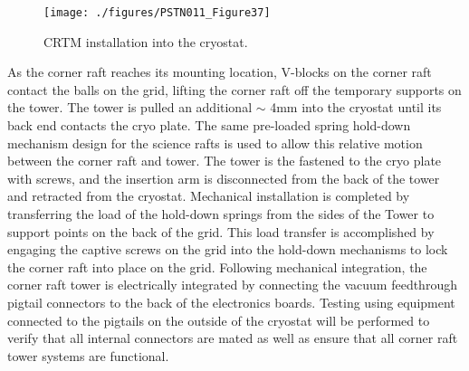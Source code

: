 \begin{figure}[htbp]
\begin{center}
\texttt{[image: ./figures/PSTN011\_Figure37]}
\caption{CRTM installation into the cryostat.}
\label{fig:Fig37}
\end{center}
\end{figure}

As the corner raft reaches its mounting location, V-blocks on the corner raft contact the balls on the
grid, lifting the corner raft off the temporary supports on the tower. The tower is pulled an additional
$\sim$ 4mm into the cryostat until its back end contacts the cryo plate. The same pre-loaded spring hold-down
mechanism design for the science rafts is used to allow this relative motion between the corner
raft and tower. The tower is the fastened to the cryo plate with screws, and the insertion arm is
disconnected from the back of the tower and retracted from the cryostat.
Mechanical installation is completed by transferring the load of the hold-down springs from the sides of
the Tower to support points on the back of the grid. This load transfer is accomplished by engaging the
captive screws on the grid into the hold-down mechanisms to lock the corner raft into place on the grid.
Following mechanical integration, the corner raft tower is electrically integrated by connecting the
vacuum feedthrough pigtail connectors to the back of the electronics boards. Testing using equipment
connected to the pigtails on the outside of the cryostat will be performed to verify that all internal
connectors are mated as well as ensure that all corner raft tower systems are functional.

